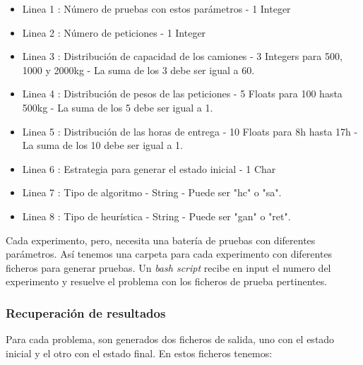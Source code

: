 \documentclass{article}
\begin{document}
\begin{itemize}
\item Linea 1 : Número de pruebas con estos parámetros - 1 Integer
\item Linea 2 : Número de peticiones - 1 Integer
\item Linea 3 : Distribución de capacidad de los camiones - 3 Integers para 500,
1000 y 2000kg - La suma de los 3 debe ser igual a 60.
\item Linea 4 : Distribución de pesos de las peticiones - 5 Floats para 100
hasta 500kg - La suma de los 5 debe ser igual a 1.
\item Linea 5 : Distribución de las horas de entrega - 10 Floats para 8h hasta
17h - La suma de los 10 debe ser igual a 1.
\item Linea 6 : Estrategia para generar el estado inicial - 1 Char
\item Linea 7 : Tipo de algoritmo - String - Puede ser "hc" o "sa".
\item Linea 8 : Tipo de heurística - String - Puede ser "gan" o "ret".
\end{itemize}

Cada experimento, pero, necesita una batería de pruebas con diferentes
parámetros. Así tenemos una carpeta para cada experimento con diferentes
ficheros para generar pruebas. Un {\it bash script} recibe en input el numero
del experimento y resuelve el problema con los ficheros de prueba pertinentes.

\subsubsection{Recuperación de resultados}

Para cada problema, son generados dos ficheros de salida, uno con el estado
inicial y el otro con el estado final. En estos ficheros tenemos:
\end{document}
